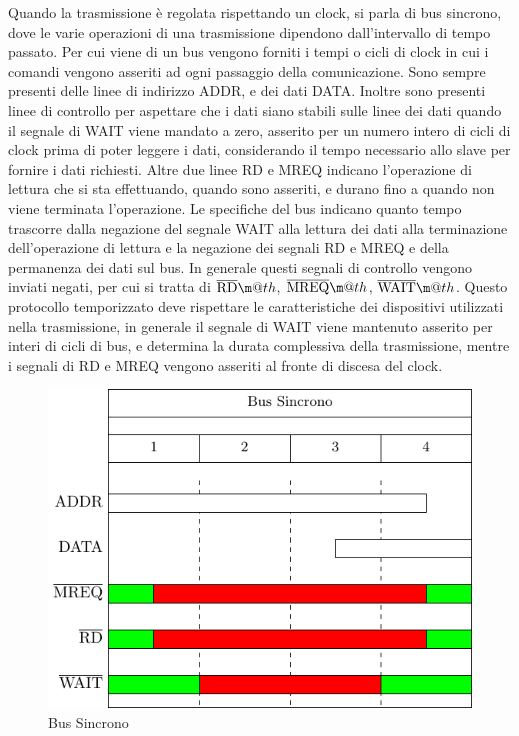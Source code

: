 \documentclass{article}
\makeatletter
\newcommand*{\textoverline}[1]{$\overline{\hbox{#1}}\m@th$}
\numberwithin{equation}{subsection}
\makeatother
\begin{document}
Quando la trasmissione è regolata rispettando un clock, si parla di bus sincrono, dove le varie operazioni di una trasmissione dipendono dall'intervallo di tempo 
passato. Per cui viene di un bus vengono forniti i tempi o cicli di clock in cui i comandi vengono asseriti ad ogni passaggio della comunicazione. 
Sono sempre presenti delle linee di indirizzo ADDR, e dei dati DATA. Inoltre sono presenti linee di controllo per aspettare che i dati siano stabili sulle linee dei dati 
quando il segnale di WAIT viene mandato a zero, asserito per un numero intero di cicli di clock prima di poter leggere i dati, considerando il tempo necessario allo slave 
per fornire i dati richiesti. Altre due linee RD e MREQ indicano l'operazione di lettura che si sta effettuando, quando sono asseriti, e durano fino a quando non viene terminata 
l'operazione. Le specifiche del bus indicano quanto tempo trascorre dalla negazione del segnale WAIT alla lettura dei dati alla terminazione dell'operazione di lettura e la 
negazione dei segnali RD e MREQ e della permanenza dei dati sul bus. 
In generale questi segnali di controllo vengono inviati negati, per cui si tratta di \textoverline{RD}, \textoverline{MREQ}, \textoverline{WAIT}. 
Questo protocollo temporizzato deve rispettare le caratteristiche dei dispositivi utilizzati nella trasmissione, in generale il segnale di WAIT viene mantenuto 
asserito per interi di cicli di bus, e determina la durata complessiva della trasmissione, mentre i segnali di RD e MREQ vengono asseriti al fronte di discesa del clock. 

\begin{figure}[H]%
    \centering%
    \includegraphics{bus-sincrono.pdf}%
    \caption{Bus Sincrono}%
\end{figure}
\end{document}
